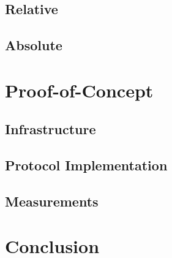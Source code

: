

\subsection{Relative \pol{}} \label{sec:protocol-fundamentals-rel-pol}



\newpage

\subsection{Absolute \pol{}} \label{sec:protocol-fundamentals-abs-pol}



\newpage
\section{Proof-of-Concept} \label{sec:proof-of-concept}



\subsection{Infrastructure} \label{sec:proof-of-concept-infrastructure}



\subsection{Protocol Implementation} \label{sec:proof-of-concept-pol-implementation}



\subsection{Measurements} \label{sec:proof-of-concept-results}



\newpage

\section{Conclusion} \label{sec:conclusion}



\newpage



\newpage

